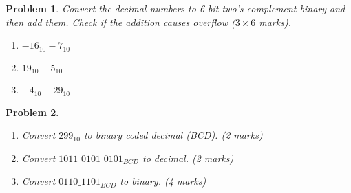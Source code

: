 \documentclass{article}
\newtheorem{prob}{Problem}
\begin{document}
\vspace{20em}

\begin{prob}
  Convert the decimal numbers to 6-bit two's complement binary and then add
  them. Check if the addition causes overflow ($3 \times 6$ marks).
  \begin{enumerate}
  \item $-16_{10} - 7_{10}$
  \item $19_{10} - 5_{10}$
  \item $-4_{10} - 29_{10}$
  \end{enumerate}
\end{prob}

\vspace{20em}

\begin{prob}
  \begin{enumerate}
  \item Convert $299_{10}$  to binary coded decimal (BCD). (2 marks)
  \item Convert $1011\_ 0101\_ 0101_{BCD}$  to decimal. (2 marks)
  \item Convert $0110\_ 1101_{BCD}$  to binary. (4 marks)
  \end{enumerate}
\end{prob}

\vspace{20em}
\end{document}
